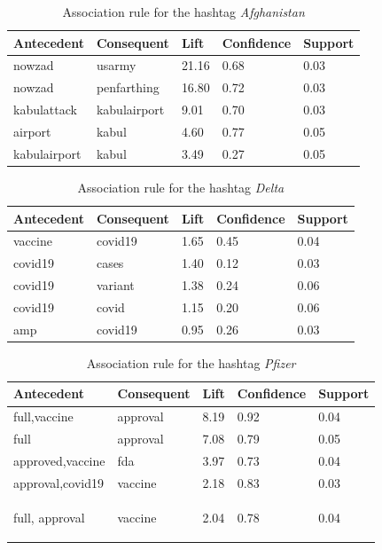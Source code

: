 \documentclass[12pt,%
               a4paper,%
               oneside,openany,%
               titlepage,%
               headinclude,footinclude,%
               BCOR5mm,%
               cleardoublepage=empty,%
               tablecaptionabove,%
               floatperchapter,
               ]{scrreprt}                 %
\begin{document}
\begin{table}[]
\caption{Association rule for the hashtag \textit{Afghanistan}}
\begin{tabular}{l|l|l|l|l}
\textbf{Antecedent} & \textbf{Consequent}  & \textbf{Lift} & \textbf{Confidence} & \textbf{Support}\\ \hline
nowzad       & usarmy       & 21.16 & 0.68       & 0.03    \\ \hline
nowzad       & penfarthing  & 16.80 & 0.72       & 0.03    \\ \hline
kabulattack  & kabulairport & 9.01  & 0.70       & 0.03    \\ \hline
airport      & kabul        & 4.60  & 0.77       & 0.05    \\ \hline
kabulairport & kabul        & 3.49  & 0.27       & 0.05
\label{ASS_Afghanistan}
\end{tabular}
\end{table}

\begin{table}[]
\caption{Association rule for the hashtag \textit{Delta}}
\begin{tabular}{l|l|l|l|l}
\textbf{Antecedent} & \textbf{Consequent}  & \textbf{Lift} & \textbf{Confidence} & \textbf{Support }\\ \hline
vaccine    & covid19    & 1.65 & 0.45       & 0.04    \\ \hline
covid19    & cases      & 1.40 & 0.12       & 0.03    \\ \hline
covid19    & variant    & 1.38 & 0.24       & 0.06    \\ \hline
covid19    & covid      & 1.15 & 0.20       & 0.06    \\ \hline
amp        & covid19    & 0.95 & 0.26       & 0.03
\label{ASS_Delta}
\end{tabular}
\end{table}


\begin{table}[]
\caption{Association rule for the hashtag \textit{Pfizer}}
\begin{tabular}{l|l|l|l|l}
\textbf{Antecedent} & \textbf{Consequent}  & \textbf{Lift} & \textbf{Confidence} & \textbf{Support}\\ \hline
full,vaccine     & approval   & 8.19 & 0.92       & 0.04    \\ \hline
full             & approval   & 7.08 & 0.79       & 0.05    \\ \hline
approved,vaccine & fda        & 3.97 & 0.73       & 0.04    \\ \hline
approval,covid19 & vaccine    & 2.18 & 0.83       & 0.03    \\ \hline
full, approval   & vaccine    & 2.04 & 0.78       & 0.04

\label{ASS_Pfizer}
\end{tabular}
\end{table}
\end{document}
